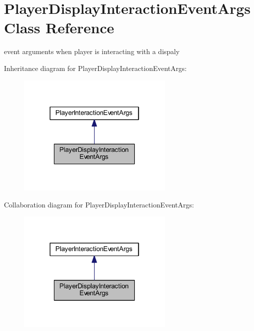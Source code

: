 \hypertarget{class_player_display_interaction_event_args}{}\section{Player\+Display\+Interaction\+Event\+Args Class Reference}
\label{class_player_display_interaction_event_args}


event arguments when player is interacting with a dispaly  




Inheritance diagram for Player\+Display\+Interaction\+Event\+Args\+:
\nopagebreak
\begin{figure}[H]
\begin{center}
\leavevmode
\includegraphics[width=214pt]{class_player_display_interaction_event_args__inherit__graph}
\end{center}
\end{figure}


Collaboration diagram for Player\+Display\+Interaction\+Event\+Args\+:
\nopagebreak
\begin{figure}[H]
\begin{center}
\leavevmode
\includegraphics[width=214pt]{class_player_display_interaction_event_args__coll__graph}
\end{center}
\end{figure}
